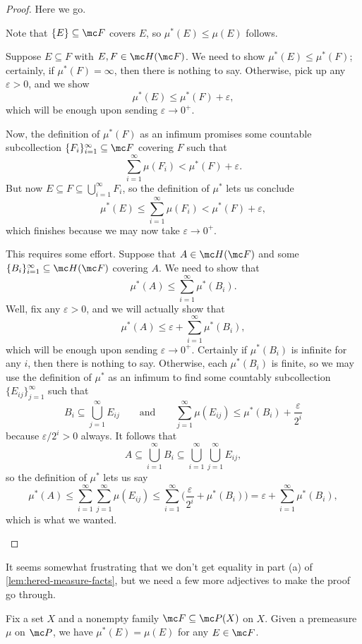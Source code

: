 \documentclass[../notes.tex]{subfiles}
\begin{document}
\begin{proof}
	Here we go.
	\begin{listalph}
		\item Note that $\{E\}\subseteq\mc F$ covers $E$, so $\mu^*(E)\le\mu(E)$ follows.
		\item Suppose $E\subseteq F$ with $E,F\in\mc H(\mc F)$. We need to show $\mu^*(E)\le\mu^*(F)$; certainly, if $\mu^*(F)=\infty$, then there is nothing to say. Otherwise, pick up any $\varepsilon>0$, and we show
		\[\mu^*(E)\le\mu^*(F)+\varepsilon,\]
		which will be enough upon sending $\varepsilon\to0^+$.

		Now, the definition of $\mu^*(F)$ as an infimum promises some countable subcollection $\{F_i\}_{i=1}^\infty\subseteq\mc F$ covering $F$ such that
		\[\sum_{i=1}^\infty\mu(F_i)<\mu^*(F)+\varepsilon.\]
		But now $E\subseteq F\subseteq\bigcup_{i=1}^\infty F_i$, so the definition of $\mu^*$ lets us conclude
		\[\mu^*(E)\le\sum_{i=1}^\infty\mu(F_i)<\mu^*(F)+\varepsilon,\]
		which finishes because we may now take $\varepsilon\to0^+$.
		\item This requires some effort. Suppose that $A\in\mc H(\mc F)$ and some $\{B_i\}_{i=1}^\infty\subseteq\mc H(\mc F)$ covering $A$. We need to show that
		\[\mu^*(A)\le\sum_{i=1}^\infty\mu^*(B_i).\]
		Well, fix any $\varepsilon>0$, and we will actually show that
		\[\mu^*(A)\le\varepsilon+\sum_{i=1}^\infty\mu^*(B_i),\]
		which will be enough upon sending $\varepsilon\to0^+$. Certainly if $\mu^*(B_i)$ is infinite for any $i$, then there is nothing to say. Otherwise, each $\mu^*(B_i)$ is finite, so we may use the definition of $\mu^*$ as an infimum to find some countably subcollection $\{E_{ij}\}_{j=1}^\infty$ such that
		\[B_i\subseteq\bigcup_{j=1}^\infty E_{ij}\qquad\text{and}\qquad\sum_{j=1}^\infty\mu(E_{ij})\le\mu^*(B_i)+\frac{\varepsilon}{2^i}\]
		because $\varepsilon/2^i>0$ always. It follows that
		\[A\subseteq\bigcup_{i=1}^\infty B_i\subseteq\bigcup_{i=1}^\infty\bigcup_{j=1}^\infty E_{ij},\]
		so the definition of $\mu^*$ lets us say
		\[\mu^*(A)\le\sum_{i=1}^\infty\sum_{j=1}^\infty\mu(E_{ij})\le\sum_{i=1}^\infty\Bigg(\frac{\varepsilon}{2^i}+\mu^*(B_i)\Bigg)=\varepsilon+\sum_{i=1}^\infty\mu^*(B_i),\]
		which is what we wanted.
		\qedhere
	\end{listalph}
\end{proof}
It seems somewhat frustrating that we don't get equality in part (a) of \autoref{lem:hered-measure-facts}, but we need a few more adjectives to make the proof go through.
\begin{lemma} \label{lem:hered-measure-extends}
	Fix a set $X$ and a nonempty family $\mc F\subseteq\mc P(X)$ on $X$. Given a premeasure $\mu$ on $\mc P$, we have $\mu^*(E)=\mu(E)$ for any $E\in\mc F$.
\end{lemma}
\end{document}
